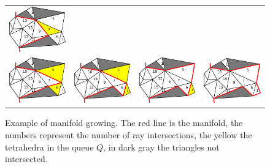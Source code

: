 \begin{figure}[tp]
\begin{tabular}{cccc}
  \includegraphics[width=0.24\columnwidth]{./img/ch_soa/incrementalGrowing07}\\
  \includegraphics[width=0.24\columnwidth]{./img/ch_soa/incrementalGrowing08}&
  \includegraphics[width=0.24\columnwidth]{./img/ch_soa/incrementalGrowing09}&
  \includegraphics[width=0.24\columnwidth]{./img/ch_soa/incrementalGrowing10}&
  \includegraphics[width=0.24\columnwidth]{./img/ch_soa/incrementalGrowing11}\\
 \end{tabular}
 \caption{Example of manifold growing. The red line is the manifold, the numbers represent the number of ray intersections, the yellow the tetrahedra in the queue $Q$, in dark gray the triangles not intersected.}
 \label{fig:growing}
\end{figure}






